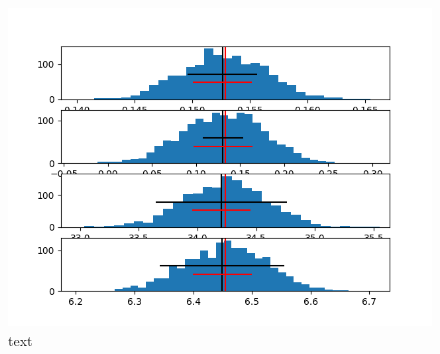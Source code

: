 \begin{figure}[h]
	\centering
	\includegraphics[width=\textwidth]{HistSampTT.png}
	\caption[]{text}
	\label{fig:Results}
\end{figure}
